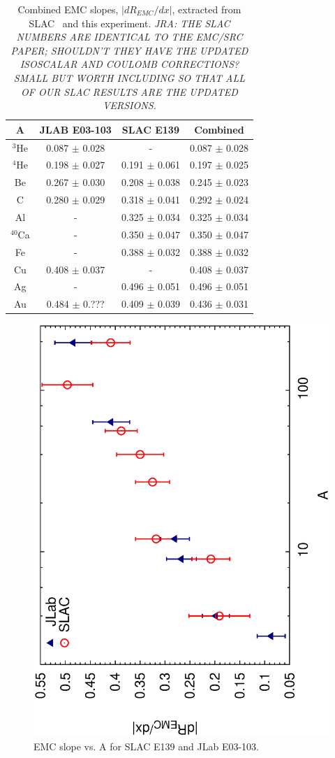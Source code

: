 

\begin{table}[htb]
\begin{center}
\caption{Combined EMC slopes, $|dR_{EMC}/dx|$, extracted from
SLAC~\cite{slace139,arrington12c} and this experiment.
\textit{JRA: THE SLAC NUMBERS ARE IDENTICAL TO THE EMC/SRC PAPER; SHOULDN'T
THEY HAVE THE UPDATED ISOSCALAR AND COULOMB CORRECTIONS?  SMALL BUT WORTH
INCLUDING SO THAT ALL OF OUR SLAC RESULTS ARE THE UPDATED VERSIONS.}}
\begin{tabular}{|c|c|c|c|}
\hline
A & JLAB E03-103& SLAC E139& Combined\\
\hline
$^3$He  & 0.087 $\pm$ 0.028 &        -          & 0.087 $\pm$ 0.028 \\
$^4$He  & 0.198 $\pm$ 0.027 & 0.191 $\pm$ 0.061 & 0.197 $\pm$ 0.025 \\
Be      & 0.267 $\pm$ 0.030 & 0.208 $\pm$ 0.038 & 0.245 $\pm$ 0.023 \\
C       & 0.280 $\pm$ 0.029 & 0.318 $\pm$ 0.041 & 0.292 $\pm$ 0.024 \\
Al      &        -          & 0.325 $\pm$ 0.034 & 0.325 $\pm$ 0.034 \\
$^{40}$Ca &       -         & 0.350 $\pm$ 0.047 & 0.350 $\pm$ 0.047 \\
Fe      &        -          & 0.388 $\pm$ 0.032 & 0.388 $\pm$ 0.032 \\
Cu      & 0.408 $\pm$ 0.037 &          -        & 0.408 $\pm$ 0.037 \\
Ag      &        -          & 0.496 $\pm$ 0.051 & 0.496 $\pm$ 0.051 \\
Au      & 0.484 $\pm$ 0.??? & 0.409 $\pm$ 0.039 & 0.436 $\pm$ 0.031 \\
\hline
\end{tabular}
\end{center}
\label{slope_emc_table}
\end{table}

\begin{figure}[htbp]
\begin{center}
\includegraphics[angle=-90,width=.42\textwidth]{plots/emc_slac_xem_vs_a_bars.eps}
\caption{EMC slope vs. A for SLAC E139 and JLab E03-103.}
\label{adep_slac_jlab}
\end{center}
\end{figure}


